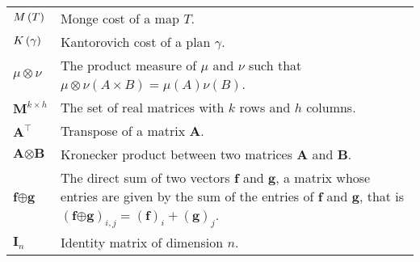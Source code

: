 \begin{longtable*}{ p{0.1\textwidth} p{0.8\textwidth} }
	$M\left(T\right)$ & Monge cost of a map $T$. \\
	$K\left(\gamma\right)$ & Kantorovich cost of a plan $\gamma$. \\	
	$\mu \otimes \nu$ & The product measure of $\mu$ and $\nu$ such that $\mu \otimes \nu (A\times B)= \mu(A)\nu(B)$.\\
	$\mathbf{M}^{k\times h}$ & The set of real matrices with $k$ rows and $h$ columns. \\
	$\mathbf{A}^\top$ & Transpose of a matrix $\mathbf{A}$. \\
	$\mathbf{A}\pmb{\otimes}\mathbf{B}$& Kronecker product between two matrices $\mathbf{A}$ and $\mathbf{B}$.\\
	$\mathbf{f}\pmb{\oplus}\mathbf{g}$ & The direct sum of two vectors $\mathbf{f}$ and $\mathbf{g}$, a matrix whose entries are given by the sum of the entries of $\mathbf{f}$ and $\mathbf{g}$, that is  $(\mathbf{f}\pmb{\oplus}\mathbf{g})_{i,j}=(\mathbf{f})_i+(\mathbf{g})_j$.\\
	$\mathbf{I}_n$ & Identity matrix of dimension $n$.
\end{longtable*}
